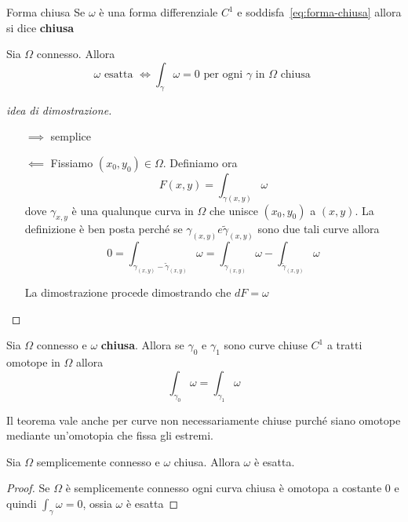 \begin{definition}{Forma chiusa}
    Se \(\omega\) è una forma differenziale \(C^{1}\) e
    soddisfa~\eqref{eq:forma-chiusa} allora si dice \textbf{chiusa} 
\end{definition}
\begin{theorem}\label{thm:1_forme}
    Sia \(\Omega\) connesso. Allora 
    \[
        \omega \text{ esatta } \iff \int_{\gamma} \omega = 0 \text{ per ogni
        \(\gamma\) in \(\Omega\) chiusa }
    \]
\end{theorem}
\begin{proof}[idea di dimostrazione]\( \)
\begin{itemize}
    \item[\(\implies \)] semplice
    \item[\(\impliedby \)] Fissiamo \((x_{0},y_{0}) \in \Omega\). Definiamo ora 
        \[
            F(x, y) = \int_{\gamma(x,y)} \omega
        \]
        dove \(\gamma_{x,y} \) è una qualunque curva in \(\Omega\) che unisce
        \((x_{0},y_{0})\) a \((x,y)\). La definizione è ben posta perché se
        \(\gamma_{(x,y)} e \tilde{\gamma}_{(x,y)}\) sono due tali curve allora
        \[
            0 = \int_{\gamma_{(x,y)} - \tilde{\gamma}_{(x,y)}} \omega =
            \int_{\gamma_{(x,y)}} \omega - \int_{\tilde{\gamma}_{(x,y)}} \omega
        \]

        La dimostrazione procede dimostrando che \(dF = \omega\)
\end{itemize}
\end{proof}

\begin{theorem}\label{thm:2_forme}
    Sia \(\Omega\) connesso e \(\omega\) \textbf{chiusa}. Allora se
    \(\gamma_{0}\) e \(\gamma_{1}\) sono curve chiuse \(C^{1}\) a tratti omotope
    in \(\Omega\) allora
    \[
        \int_{\gamma_{0}} \omega = \int_{\gamma_{1}} \omega
    \]
\end{theorem}
\begin{remark}
    Il teorema vale anche per curve non necessariamente chiuse purché siano omotope 
    mediante un'omotopia che fissa gli estremi.
\end{remark}

\begin{corollary}
    Sia \(\Omega\) semplicemente connesso e \(\omega\) chiusa. Allora \(\omega\)
    è esatta.
\end{corollary}
\begin{proof}
    Se \(\Omega\) è semplicemente connesso ogni curva chiusa è omotopa a
    costante \(0\) e quindi \(\int_{\gamma} \omega = 0\), ossia \(\omega\) è
    esatta 
\end{proof}


